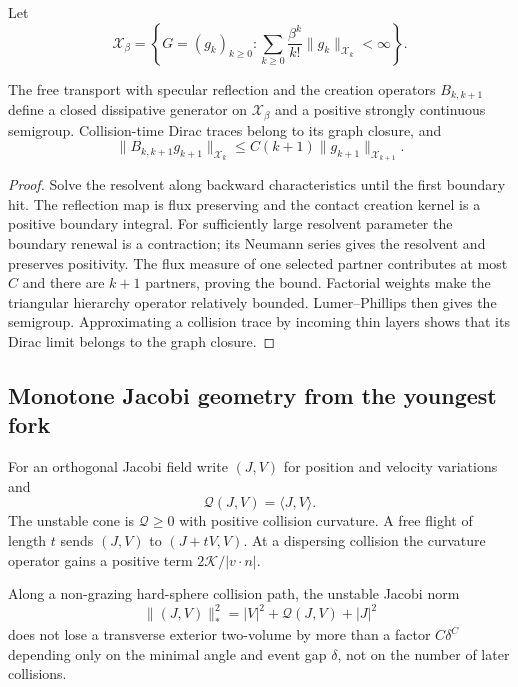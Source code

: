 Let
\[
 \mathcal X_\beta=\left\{G=(g_k)_{k\ge0}:
 \sum_{k\ge0}\frac{\beta^k}{k!}\|g_k\|_{\mathcal X_k}<\infty\right\}.
\]

\begin{theorem}
\label{thm:r8-b2-semigroup}
The free transport with specular reflection and the creation operators
$B_{k,k+1}$ define a closed dissipative generator on $\mathcal X_\beta$ and a
positive strongly continuous semigroup.  Collision-time Dirac traces belong to
its graph closure, and
\[
 \|B_{k,k+1}g_{k+1}\|_{\mathcal X_k}
 \le C(k+1)\|g_{k+1}\|_{\mathcal X_{k+1}}.
\]
\end{theorem}

\begin{proof}
Solve the resolvent along backward characteristics until the first boundary
hit.  The reflection map is flux preserving and the contact creation kernel is
a positive boundary integral.  For sufficiently large resolvent parameter the
boundary renewal is a contraction; its Neumann series gives the resolvent and
preserves positivity.  The flux measure of one selected partner contributes at
most $C$ and there are $k+1$ partners, proving the bound.  Factorial weights
make the triangular hierarchy operator relatively bounded.  Lumer--Phillips
then gives the semigroup.  Approximating a collision trace by incoming thin
layers shows that its Dirac limit belongs to the graph closure.
\end{proof}

\subsection{Monotone Jacobi geometry from the youngest fork}

For an orthogonal Jacobi field write $(J,V)$ for position and velocity
variations and
\[
 \mathcal Q(J,V)=\langle J,V\rangle.
\]
The unstable cone is $\mathcal Q\ge0$ with positive collision curvature.  A
free flight of length $t$ sends $(J,V)$ to $(J+tV,V)$.  At a dispersing
collision the curvature operator gains a positive term
$2\mathcal K/|v\cdot n|$.

\begin{lemma}
\label{lem:r8-b2-monotone}
Along a non-grazing hard-sphere collision path, the unstable Jacobi norm
\[
 \|(J,V)\|_*^2=|V|^2+\mathcal Q(J,V)+|J|^2
\]
does not lose a transverse exterior two-volume by more than a factor
$C\delta^C$ depending only on the minimal angle and event gap $\delta$, not on
the number of later collisions.
\end{lemma}

